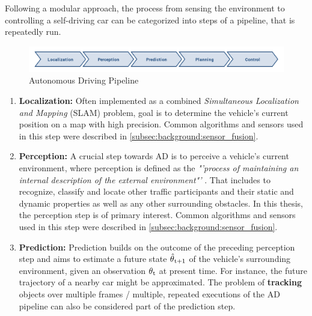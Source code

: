 Following a modular approach, the process from sensing the environment to controlling a self-driving car can be categorized into steps of a pipeline, that is repeatedly run. 

\begin{figure}[H]
	\centering
	\includegraphics[width=\textwidth]{98_images/ad_pipeline.png}
	\caption{Autonomous Driving Pipeline}
	\label{fig:autonomous_driving_pipeline}
\end{figure}

\begin{enumerate}
	\item \textbf{Localization:} Often implemented as a combined \textit{Simultaneous Localization and Mapping} (SLAM) problem, goal is to determine the vehicle's current position on a map with high precision. Common algorithms and sensors used in this step were described in \cref{subsec:background:sensor_fusion}.
	\item \textbf{Perception:} A crucial step towards AD is to perceive a vehicle's current environment, where perception is defined as the \textit{"'process of maintaining an internal description of the external environment"'} \cite{Crowley1993}. That includes to recognize, classify and locate other traffic participants and their static and dynamic properties as well as any other surrounding obstacles. In this thesis, the perception step is of primary interest. Common algorithms and sensors used in this step were described in \cref{subsec:background:sensor_fusion}.
	\item \textbf{Prediction:} Prediction builds on the outcome of the preceding perception step and aims to estimate a future state $\hat{\theta}\textsubscript{t+1}$ of the vehicle's surrounding environment, given an observation $\theta\textsubscript{t}$ at present time. For instance, the future trajectory of a nearby car might be approximated. The problem of \textbf{tracking} objects over multiple frames / multiple, repeated executions of the AD pipeline can also be considered part of the prediction step. 

\end{enumerate}
